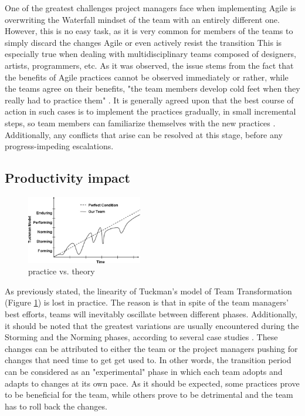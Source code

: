 \documentclass{scrartcl}
\begin{document}
    One of the greatest challenges project managers face when implementing Agile is overwriting the Waterfall mindset of the team with an entirely different one. However, this is no easy task, as it is very common for members of the teams to simply discard the changes Agile or even actively resist the transition \cite{MtnGoat} This is especially true when dealing with multidisciplinary teams composed of designers, artists, programmers, etc. As it was observed, the issue stems from the fact that the benefits of Agile practices cannot be observed immediately or rather, while the teams agree on their benefits, "the team members develop cold feet when they really had to practice them" \cite{4599456}. It is generally agreed upon that the best course of action in such cases is to implement the practices gradually, in small incremental steps, so team members can familiarize themselves with the new practices \cite{4293601, 4599458}. Additionally, any conflicts that arise can be resolved at this stage, before any progress-impeding escalations.
    
    \newpage
    
    \subsection{Productivity impact}
    
    \begin{figure}
        \centering
        \includegraphics[width=0.45\textwidth]{tuckman.jpg}
        \caption{practice vs. theory}
        \label{fig:tuckman}
    \end{figure}
    
    As previously stated, the linearity of Tuckman's model of Team Transformation (Figure \ref{fig:tuckman}) is lost in practice. The reason is that in spite of the team managers' best efforts, teams will inevitably oscillate between different phases. Additionally, it should be noted that the greatest variations are usually encountered during the Storming and the Norming phases, according to several case studies \cite{4599456, 4599458}. These changes can be attributed to either the team or the project managers pushing for changes that need time to get get used to. In other words, the transition period can be considered as an "experimental" phase in which each team adopts and adapts to changes at its own pace. As it should be expected, some practices prove to be beneficial for the team, while others prove to be detrimental and the team has to roll back the changes. \\
    
\end{document}
